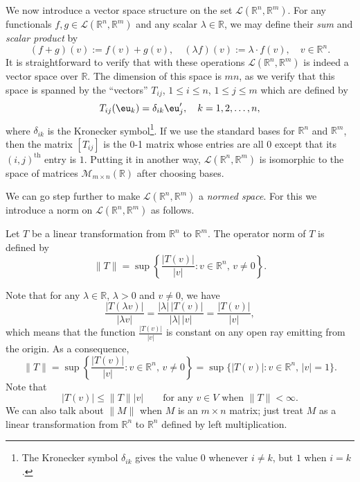 \documentclass[11pt]{article}
\begin{document}
We now introduce a vector space structure on the set $\mathcal{L}(\mathbb{R}^n, \mathbb{R}^m)$.
For any functionals $f, g \in \mathcal{L}(\mathbb{R}^n, \mathbb{R}^m)$ and any scalar $\lambda \in \mathbb{R}$, we may define their \textit{sum} and \textit{scalar product} by
\[
  (f+g)(v) := f(v) + g(v), \quad (\lambda f)(v) := \lambda \cdot f(v), \quad v \in \mathbb{R}^n.
\]
It is straightforward to verify that with these operations $\mathcal{L}(\mathbb{R}^n, \mathbb{R}^m)$ is indeed a vector space over $\mathbb{R}$.
The dimension of this space is $mn$, as we verify that this space is spanned by the ``vectors'' $T_{ij}$, $1 \leqslant i \leqslant n$, $1 \leqslant j 	\leqslant m$ which are defined by
\[
  T_{ij}(\eu_k) = \delta_{ik} \eu'_j, \quad k = 1, 2, \dots, n,
\]
where $\delta_{ik}$ is the Kronecker symbol\footnote{The Kronecker symbol $\delta_{ik}$ gives the value $0$ whenever $i \ne k$, but $1$ when $i=k$.}.
If we use the standard bases for $\mathbb{R}^n$ and $\mathbb{R}^m$, then the matrix $[T_{ij}]$ is the 0-1 matrix whose entries are all $0$ except that its $(i,j)^{\text{th}}$ entry is $1$.
Putting it in another way, $\mathcal{L}(\mathbb{R}^n, \mathbb{R}^m)$ is isomorphic to the space of matrices $\mathcal{M}_{m\times n}(\mathbb{R})$ after choosing bases.

We can go step further to make $\mathcal{L}(\mathbb{R}^n, \mathbb{R}^m)$ a \textit{normed space}.
For this we introduce a norm on $\mathcal{L}(\mathbb{R}^n, \mathbb{R}^m)$ as follows.

\begin{defn}
  Let $T$ be a linear transformation from $\mathbb{R}^n$ to $\mathbb{R}^m$.
  The \textsf{operator norm} of $T$ is defined by
  \[
    \| T \| = \sup \left\{ \frac{ |T(v)| }{ |v| } \colon v \in \mathbb{R}^n, \, v \ne 0 \right\}.
  \]
\end{defn}

Note that for any $\lambda \in \mathbb{R}$, $\lambda > 0$ and $v \ne 0$, we have
\[
  \frac{ |T(\lambda v)| }{ |\lambda v| } = \frac{ |\lambda| \, |T(v)| }{ |\lambda| \, |v| } = \frac{ |T(v)| }{ |v| },
\]
which means that the function $\displaystyle \frac{ |T(v)| }{ |v| }$ is constant on any open ray emitting from the origin.
As a consequence,
\[
  \| T \| = \sup \left\{ \frac{ |T(v)| }{ |v| } \colon v \in \mathbb{R}^n, \, v \ne 0 \right\} = \sup \{ |T(v)| \colon v \in \mathbb{R}^n, \, |v| = 1 \}.
\]
Note that
\begin{equation}
  \label{eq:6-norm-bound}
  | T(v) | \leqslant \| T \| |v| \qquad \text{for any $v \in V$ when $\| T \| < \infty.$}
\end{equation}
We can also talk about $\| M \|$ when $M$ is an $m \times n$ matrix; just treat $M$ as a linear transformation from $\mathbb{R}^n$ to $\mathbb{R}^n$ defined by left multiplication.
\end{document}
